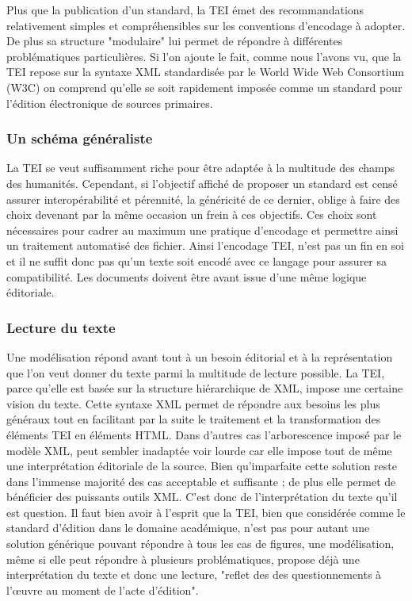 \documentclass[12pt,a4paper,oneside]{book} %
\begin{document}
Plus que la publication d'un standard, la TEI émet des recommandations relativement simples et compréhensibles sur les conventions d'encodage à adopter. De plus sa structure "modulaire" lui permet de répondre à différentes problématiques particulières. Si l'on ajoute le fait, comme nous l'avons vu, que la TEI repose sur la syntaxe XML standardisée par le World Wide Web Consortium (W3C) on comprend qu'elle se soit rapidement imposée comme un standard pour l'édition électronique de sources primaires.

\subsubsection{Un schéma généraliste}
La TEI se veut suffisamment riche pour être adaptée à la multitude des champs des humanités. Cependant, si l'objectif affiché de proposer un standard est censé assurer interopérabilité et pérennité, la généricité de ce dernier, oblige à faire des choix devenant par la même occasion un frein à ces objectifs. Ces choix sont nécessaires pour cadrer au maximum une pratique d'encodage et permettre ainsi un traitement automatisé des fichier. Ainsi l'encodage TEI, n'est pas un fin en soi et il ne suffit donc pas qu'un texte soit encodé avec ce langage pour assurer sa compatibilité. Les documents doivent être avant issue d'une même logique éditoriale.

\subsubsection{Lecture du texte}
  
Une modélisation répond avant tout à un besoin éditorial et à la représentation que l'on veut donner du texte parmi la multitude de lecture possible. La TEI, parce qu'elle est basée sur la structure hiérarchique de XML, impose une certaine vision du texte. Cette syntaxe XML permet de répondre aux besoins les plus généraux tout en facilitant par la suite le traitement et la transformation des éléments TEI en éléments HTML. Dans d'autres cas l'arborescence imposé par le modèle XML, peut sembler inadaptée voir lourde car elle impose tout de même une interprétation éditoriale de la source. 
Bien qu'imparfaite cette solution reste dans l'immense majorité des cas acceptable et suffisante ; de plus elle permet de bénéficier des puissants outils XML. 
C'est donc de l'interprétation du texte qu'il est question. Il faut bien avoir à l'esprit que la TEI, bien que considérée comme le standard d'édition dans le domaine académique, n'est pas pour autant une solution générique pouvant répondre à tous les cas de figures, une modélisation, même si elle peut répondre à plusieurs problématiques, propose déjà une interprétation du texte et donc une lecture, "reflet des des questionnements à l'œuvre au moment de l'acte d'édition".
\end{document}
